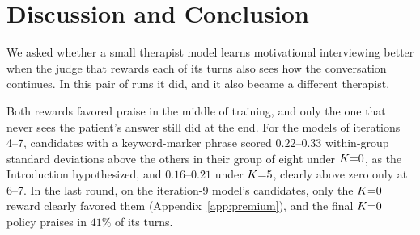 \section{Discussion and Conclusion}
\label{sec:discussion}

We asked whether a small therapist model learns motivational interviewing better when the judge
that rewards each of its turns also sees how the conversation continues. In this pair of runs it
did, and it also became a different therapist.

Both rewards favored praise in the middle of training, and only the one that never sees the
patient's answer still did at the end. For the models of iterations 4--7, candidates with a
keyword-marker phrase scored $0.22$--$0.33$ within-group standard deviations above the others in
their group of eight under $K{=}0$, as the Introduction hypothesized, and $0.16$--$0.21$ under $K{=}5$,
clearly above zero only at 6--7. In the last round, on the iteration-9 model's candidates, only the
$K{=}0$ reward clearly favored them (Appendix~\ref{app:premium}), and the final $K{=}0$ policy praises
in $41\%$ of its turns.

